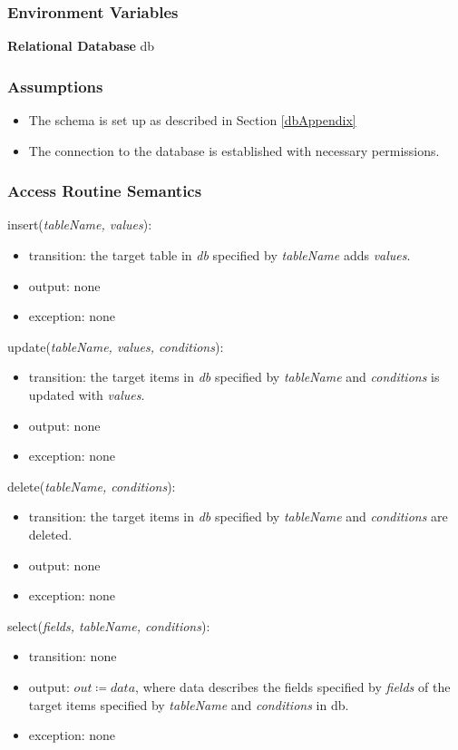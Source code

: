 \documentclass[12pt, titlepage]{article}
\begin{document}
\subsubsection{Environment Variables}
\textbf{Relational Database} db

\subsubsection{Assumptions}
\begin{itemize}
  \item The schema is set up as described in Section \ref{dbAppendix}\\
  \item The connection to the database is established with necessary permissions.
\end{itemize}

\subsubsection{Access Routine Semantics}

\noindent insert(\textit{tableName, values}):
\begin{itemize}
\item transition: the target table in \textit{db} specified by \textit{tableName} adds \textit{values}.
\item output: none
\item exception: none
\end{itemize}

\noindent update(\textit{tableName, values, conditions}):
\begin{itemize}
\item transition: the target items in \textit{db} specified by \textit{tableName} and \textit{conditions} is updated with \textit{values}.
\item output: none
\item exception: none
\end{itemize}

\noindent delete(\textit{tableName, conditions}):
\begin{itemize}
\item transition: the target items in \textit{db} specified by \textit{tableName} and \textit{conditions} are deleted.
\item output: none
\item exception: none
\end{itemize}

\noindent select(\textit{fields, tableName, conditions}):
\begin{itemize}
\item transition: none
\item output: $out \coloneqq data$, where data describes the fields specified by \textit{fields} of the target items specified by \textit{tableName} and \textit{conditions} in db.
\item exception: none
\end{itemize}
\end{document}
